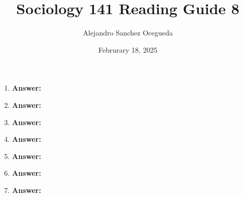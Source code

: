 \documentclass{article}
\title{Sociology 141 Reading Guide 8}
\author{Alejandro Sanchez Ocegueda}
\date{Februrary 18, 2025}
\newcommand{\answer}{\textbf{Answer:}$\;$}
\begin{document}
\maketitle

\begin{enumerate}[label=\arabic*)]
    \item 
    
    \answer 
    
    \item 
    
    \answer 
    
    
    \item 
   

    \answer
    
    \item 
    
    \answer 
    
    \item 
    
    \answer
    

    \item 
    
    \answer
    
    \item 
    
    \answer
    
\end{enumerate}
 
\end{document}
